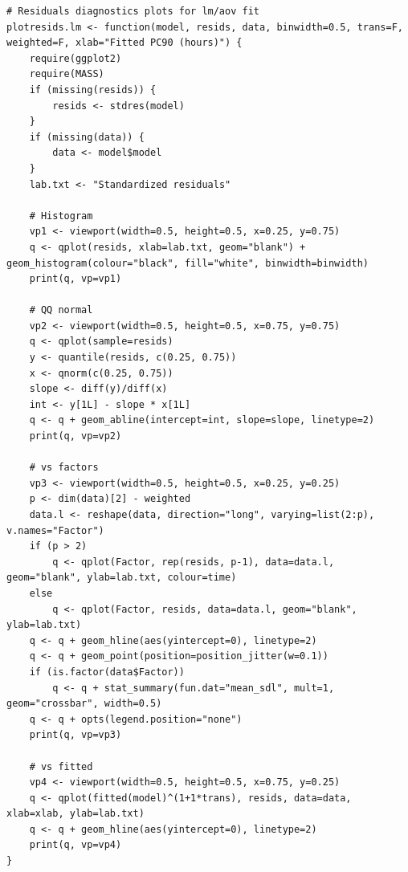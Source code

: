 \begin{lstlisting}[float=h,caption=Residuals diagnostic plots for \texttt{lm,aov} fitted models,label=R:plotresids.lm]
# Residuals diagnostics plots for lm/aov fit
plotresids.lm <- function(model, resids, data, binwidth=0.5, trans=F, weighted=F, xlab="Fitted PC90 (hours)") {
	require(ggplot2)
	require(MASS)
	if (missing(resids)) {
		resids <- stdres(model)
	}
	if (missing(data)) {
		data <- model$model
	}
	lab.txt <- "Standardized residuals"

	# Histogram
	vp1 <- viewport(width=0.5, height=0.5, x=0.25, y=0.75)
	q <- qplot(resids, xlab=lab.txt, geom="blank") + geom_histogram(colour="black", fill="white", binwidth=binwidth) 
	print(q, vp=vp1)

	# QQ normal
	vp2 <- viewport(width=0.5, height=0.5, x=0.75, y=0.75)
	q <- qplot(sample=resids)
	y <- quantile(resids, c(0.25, 0.75))
	x <- qnorm(c(0.25, 0.75))
	slope <- diff(y)/diff(x)
	int <- y[1L] - slope * x[1L]
	q <- q + geom_abline(intercept=int, slope=slope, linetype=2)
	print(q, vp=vp2)

	# vs factors
	vp3 <- viewport(width=0.5, height=0.5, x=0.25, y=0.25)
	p <- dim(data)[2] - weighted
	data.l <- reshape(data, direction="long", varying=list(2:p), v.names="Factor")
	if (p > 2)
		q <- qplot(Factor, rep(resids, p-1), data=data.l, geom="blank", ylab=lab.txt, colour=time)
	else
		q <- qplot(Factor, resids, data=data.l, geom="blank", ylab=lab.txt)
	q <- q + geom_hline(aes(yintercept=0), linetype=2)
	q <- q + geom_point(position=position_jitter(w=0.1))
	if (is.factor(data$Factor))
		q <- q + stat_summary(fun.dat="mean_sdl", mult=1, geom="crossbar", width=0.5)
	q <- q + opts(legend.position="none")
	print(q, vp=vp3)

	# vs fitted
	vp4 <- viewport(width=0.5, height=0.5, x=0.75, y=0.25)
	q <- qplot(fitted(model)^(1+1*trans), resids, data=data, xlab=xlab, ylab=lab.txt)
	q <- q + geom_hline(aes(yintercept=0), linetype=2)
	print(q, vp=vp4)
}
\end{lstlisting}

